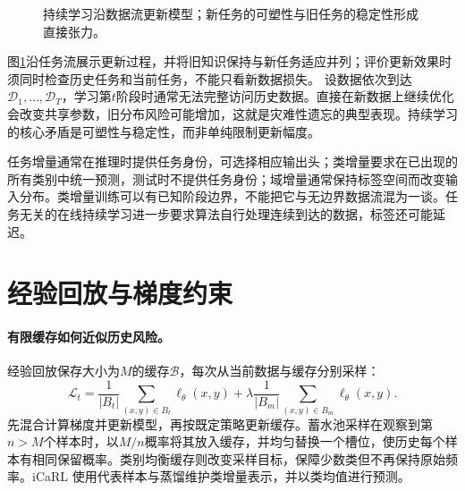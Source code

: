 \begin{figure}[htbp]
\centering
{}
\caption{持续学习沿数据流更新模型；新任务的可塑性与旧任务的稳定性形成直接张力。}
\label{fig:continual-stability-plasticity}
\end{figure}
图\ref{fig:continual-stability-plasticity}沿任务流展示更新过程，并将旧知识保持与新任务适应并列；评价更新效果时须同时检查历史任务和当前任务，不能只看新数据损失。
设数据依次到达$\mathcal D_1,\ldots,\mathcal D_T$，学习第$t$阶段时通常无法完整访问历史数据。直接在新数据上继续优化会改变共享参数，旧分布风险可能增加，这就是灾难性遗忘的典型表现。持续学习的核心矛盾是可塑性与稳定性，而非单纯限制更新幅度\cite{delange2022continual}。

任务增量通常在推理时提供任务身份，可选择相应输出头；类增量要求在已出现的所有类别中统一预测，测试时不提供任务身份；域增量通常保持标签空间而改变输入分布。类增量训练可以有已知阶段边界，不能把它与无边界数据流混为一谈。任务无关的在线持续学习进一步要求算法自行处理连续到达的数据，标签还可能延迟。

\section{经验回放与梯度约束}
\paragraph{有限缓存如何近似历史风险。}
经验回放保存大小为$M$的缓存$\mathcal B$，每次从当前数据与缓存分别采样：
\begin{equation}
 \mathcal L_t=\frac1{|B_t|}\sum_{(x,y)\in B_t}\ell_\theta(x,y)
 +\lambda\frac1{|B_m|}\sum_{(x,y)\in B_m}\ell_\theta(x,y).\label{eq:continual-replay-objective}
\end{equation}
先混合计算梯度并更新模型，再按既定策略更新缓存。蓄水池采样在观察到第$n>M$个样本时，以$M/n$概率将其放入缓存，并均匀替换一个槽位，使历史每个样本有相同保留概率。类别均衡缓存则改变采样目标，保障少数类但不再保持原始频率。iCaRL 使用代表样本与蒸馏维护类增量表示，并以类均值进行预测\cite{rebuffi2017icarl}。

